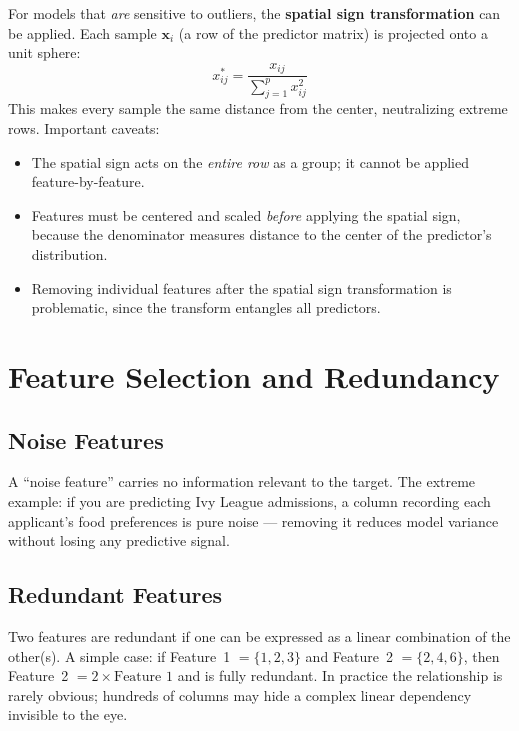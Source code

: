 \documentclass[11pt]{article}
\begin{document}
For models that \emph{are} sensitive to outliers, the \textbf{spatial sign transformation} can be applied. Each sample $\mathbf{x}_i$ (a row of the predictor matrix) is projected onto a unit sphere:
\[
  x_{ij}^{*} = \frac{x_{ij}}{\displaystyle\sum_{j=1}^{p} x_{ij}^{2}}
\]
This makes every sample the same distance from the center, neutralizing extreme rows. Important caveats:
\begin{itemize}
    \item The spatial sign acts on the \emph{entire row} as a group; it cannot be applied feature-by-feature.
    \item Features must be centered and scaled \emph{before} applying the spatial sign, because the denominator measures distance to the center of the predictor's distribution.
    \item Removing individual features after the spatial sign transformation is problematic, since the transform entangles all predictors.
\end{itemize}

\newpage
\section{Feature Selection and Redundancy}

\subsection{Noise Features}
A ``noise feature'' carries no information relevant to the target. The extreme example: if you are predicting Ivy League admissions, a column recording each applicant's food preferences is pure noise --- removing it reduces model variance without losing any predictive signal.

\subsection{Redundant Features}
Two features are redundant if one can be expressed as a linear combination of the other(s). A simple case: if Feature~1 $= \{1, 2, 3\}$ and Feature~2 $= \{2, 4, 6\}$, then Feature~2 $= 2 \times \text{Feature~1}$ and is fully redundant. In practice the relationship is rarely obvious; hundreds of columns may hide a complex linear dependency invisible to the eye.
\end{document}
